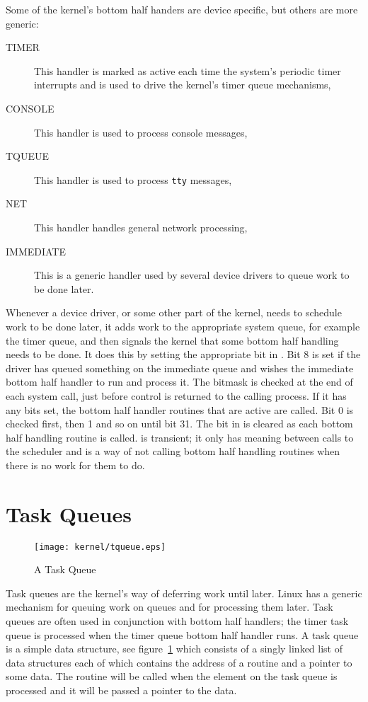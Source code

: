 Some of the kernel's bottom half handers are device specific, but others are more
generic:
\begin{description}
	\item [TIMER] This handler is marked as active each time the system's periodic
		timer interrupts and is used to drive the kernel's timer queue mechanisms,
	\item [CONSOLE] This handler is used to process console messages,
	\item [TQUEUE] This handler is used to process \texttt{tty} messages,
	\item [NET] This handler handles general network processing,
	\item [IMMEDIATE] This is a generic handler used by several device drivers
		to queue work to be done later.
\end{description}

Whenever a device driver, or some other part of the kernel, needs to schedule work 
to be done later, it adds work to the appropriate system queue, for example the timer
queue, and then signals the kernel that some bottom half handling needs to be
done.
It does this by setting the appropriate bit in .
Bit 8 is set if the driver has queued something on the immediate queue and wishes the 
immediate bottom half handler to run and process it.
The  bitmask is checked at the end of each system call, just before
control is returned to the calling process.
If it has any bits set, the bottom half handler routines that are active are called.
Bit 0 is checked first, then 1 and so on until bit 31.
The bit in  is cleared as each bottom half handling routine 
is called.
  is transient; it only has meaning between calls to the scheduler and
is a way of not calling bottom half handling routines when there is no work for them to
do.

\section{Task Queues}
\label{kernel-task-queue-section}
\begin{figure}
\begin{center}
{\centering \texttt{[image: kernel/tqueue.eps]} \par}
\end{center}
\caption{A Task Queue}
\label{tq-figure}
\end{figure}
Task queues are the kernel's way of deferring work until later.
Linux has a generic mechanism for queuing work on queues and for processing
them later.
Task queues are often used in conjunction with bottom half handlers; the timer task queue
is processed when the timer queue bottom half handler runs.
A task queue is a simple data structure, see figure~\ref{tq-figure} which consists
of a singly linked list of  data structures each of which contains 
the address of a routine and a pointer to some data.
The routine will be called when the element on the task queue is processed and it will
be passed a pointer to the data.

